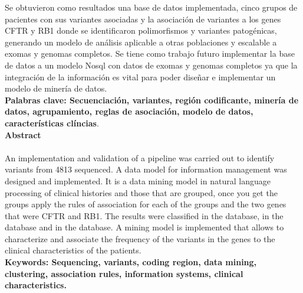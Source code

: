 Se obtuvieron como resultados una base de datos implementada, cinco grupos de pacientes con sus variantes asociadas y la asociación de variantes a los genes CFTR y RB1 donde se identificaron polimorfismos y variantes patogénicas, generando un modelo de análisis aplicable a otras poblaciones y escalable a exomas y genomas completos. Se tiene como trabajo futuro implementar la base de datos a un modelo Nosql con datos de exomas y genomas completos ya que la integración de la información es vital para poder diseñar e implementar un modelo de minería de datos.  \\

\textbf{\small Palabras clave: Secuenciación, variantes, región codificante, minería de datos, agrupamiento, reglas de asociación, modelo de datos, características clíncias}.\\


\textbf{\LARGE Abstract}\\\\
An implementation and validation of a pipeline was carried out to identify variants from 4813 sequenced. A data model for information management was designed and implemented. It is a data mining model in natural language processing of clinical histories and those that are grouped, once you get the groups apply the rules of association for each of the groups and the two genes that were  CFTR and RB1. The results were classified in the database, in the database and in the database. A mining model is implemented that allows to characterize and associate the frequency of the variants in the genes to the clinical characteristics of the patients.\\[2.0cm]
\textbf{\small Keywords: Sequencing, variants, coding region, data mining, clustering, association rules, information systems, clinical characteristics.}\\